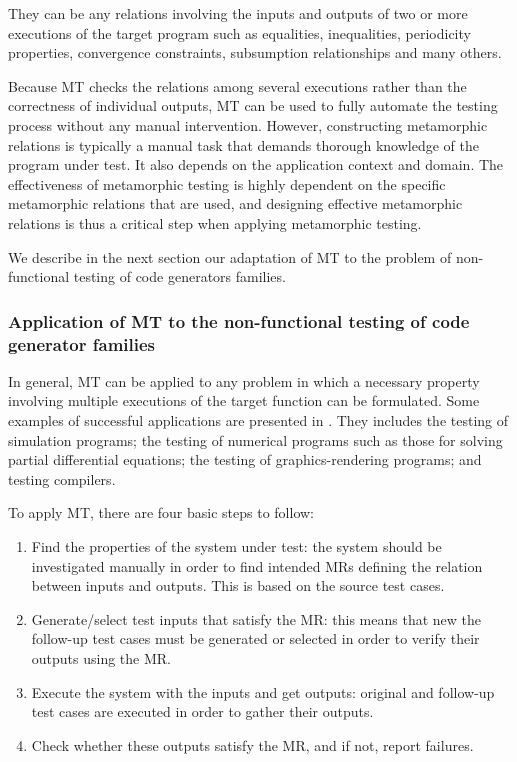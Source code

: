 They can be any relations involving the inputs and outputs of two or more executions of the target program such as equalities, inequalities, periodicity properties, convergence constraints, subsumption relationships and many others. 

Because MT checks the relations among several executions rather than the correctness of individual outputs, MT can be used to fully automate the testing process without any manual intervention. 
However, constructing metamorphic relations is typically a manual task that demands thorough knowledge of the program under test. It also depends on the application context and domain. 
The effectiveness of metamorphic testing is highly dependent on the specific metamorphic relations that are used, and designing effective metamorphic relations is thus a critical step when applying metamorphic testing.

We describe in the next section our adaptation of MT to the problem of non-functional testing of code generators families.

\subsubsection{Application of MT to the non-functional testing of code generator families}
In general, MT can be applied to any problem in which a necessary property involving multiple executions of the target function can be formulated. Some examples of successful applications are presented in \cite{zhou2004metamorphic}. They includes the testing of simulation programs; the testing of numerical programs such as those for solving partial differential equations; the testing of graphics-rendering programs; and testing compilers.

To apply MT, there are four basic steps to follow:

\begin{enumerate}
 \item Find the properties of the system under test: the system should be investigated manually in order to find intended MRs defining the relation between inputs and outputs. This is based on the source test cases.
 \item Generate/select test inputs that satisfy the MR: this means that new the follow-up test cases must be generated or selected in order to verify their outputs using the MR.
 \item Execute the system with the inputs and get outputs: original and follow-up test cases are executed in order to gather their outputs.
 \item Check whether these outputs satisfy the MR, and if not, report failures.
\end{enumerate}

